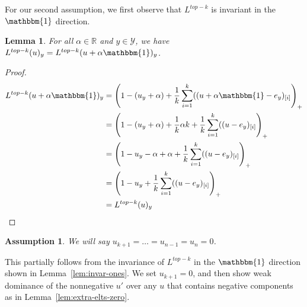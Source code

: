 \documentclass[12pt]{article}
\newcommand{\reals}{\mathbb{R}}
\newcommand{\Y}{\mathcal{Y}}
\newcommand{\ones}{\mathbbm{1}}
\newtheorem{lemma}{Lemma}
\newtheorem{assumption}{Assumption}
\begin{document}
For our second assumption, we first observe that $L^{top-k}$ is invariant in the $\ones$ direction.
\begin{lemma}
	For all $\alpha \in \reals$ and $y\in\Y$, we have $L^{top-k}(u)_y = L^{top-k}(u + \alpha \ones)_y$.
\end{lemma}
\begin{proof}\label{lem:invar-ones}
	\begin{align*}
	L^{top-k}(u + \alpha \ones)_y &= \left(1 - (u_y + \alpha) + \frac{1}{k} \sum_{i=1}^k ((u + \alpha \ones  - e_y)_{[i]} \right)_+\\
	&= \left(1 - (u_y + \alpha) +\frac{1}{k} \alpha k + \frac{1}{k} \sum_{i=1}^k ((u - e_y)_{[i]} \right)_+\\
	&= \left(1 -u_y - \alpha + \alpha + \frac{1}{k} \sum_{i=1}^k ((u - e_y)_{[i]} \right)_+\\
	&= \left(1 -u_y + \frac{1}{k} \sum_{i=1}^k ((u - e_y)_{[i]} \right)_+\\
	&= L^{top-k}(u)_y
	\end{align*}
\end{proof}

\begin{assumption}\label{assum:nonneg}
	We will say $u_{k+1} = \ldots = u_{n-1} = u_n = 0$.
\end{assumption}
This partially follows from the invariance of $L^{top-k}$ in the $\ones$ direction shown in Lemma~\ref{lem:invar-ones}.
We set $u_{k+1} = 0$, and then show weak dominance of the nonnegative $u'$ over any $u$ that contains negative components as in Lemma~\ref{lem:extra-elts-zero}.
\end{document}
